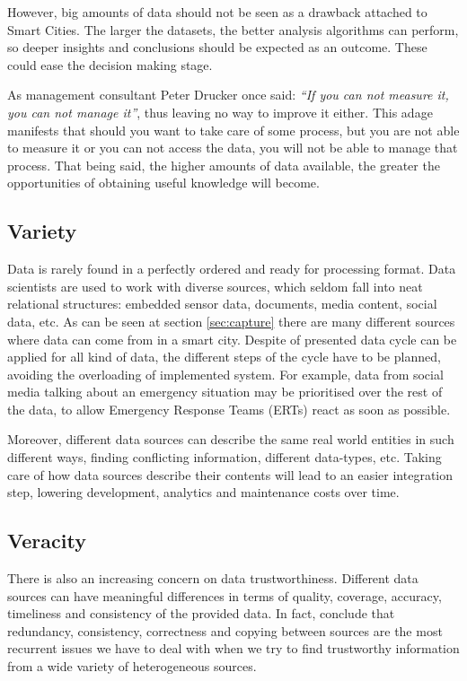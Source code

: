
However, big amounts of data should not be seen as a drawback attached to Smart Cities. The larger the datasets, the better analysis algorithms can perform, so deeper insights and conclusions should be expected as an outcome. These could ease the decision making stage.

As management consultant Peter Drucker once said: \textit{``If you can not measure it, you can not manage it''}, thus leaving no way to improve it either. This adage manifests that should you want to take care of some process, but you are not able to measure it or you can not access the data, you will not be able to manage that process. That being said, the higher amounts of data available, the greater the opportunities of obtaining useful knowledge will become.

\subsection{Variety}

Data is rarely found in a perfectly ordered and ready for processing format. Data scientists are used to work with diverse sources, which seldom fall into neat relational structures: embedded sensor data, documents, media content, social data, etc. As can be seen at section \ref{sec:capture} there are many different sources where data can come from in a smart city. Despite of presented data cycle can be applied for all kind of data, the different steps of the cycle have to be planned, avoiding the overloading of implemented system. For example, data from social media talking about an emergency situation may be prioritised over the rest of the data, to allow Emergency Response Teams (ERTs) react as soon as possible.

Moreover, different data sources can describe the same real world entities in such different ways, finding conflicting information, different data-types, etc. Taking care of how data sources describe their contents will lead to an easier integration step, lowering development, analytics and maintenance costs over time.

\subsection{Veracity}

There is also an increasing concern on data trustworthiness. Different data sources can have meaningful differences in terms of quality, coverage, accuracy, timeliness and consistency of the provided data. In fact, \cite{xian_truth_2013} conclude that redundancy, consistency, correctness and copying between sources are the most recurrent issues we have to deal with when we try to find trustworthy information from a wide variety of heterogeneous sources. 

